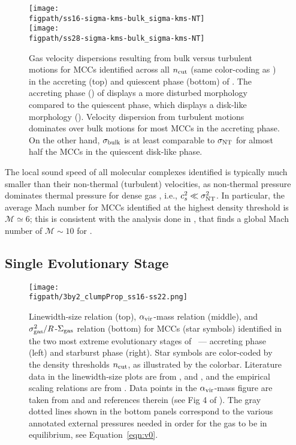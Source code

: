 \IfFileExists{emulateapjlegacy.cls}{\documentclass[iop]{emulateapjlegacy}}{\documentclass[iop]{emulateapj}}
\def\figpath{./Fig}
\begin{document}
\begin{figure}
\centering
\texttt{[image: \\figpath/ss16-sigma-kms-bulk\_sigma-kms-NT]} \\
\texttt{[image: \\figpath/ss28-sigma-kms-bulk\_sigma-kms-NT]}
\caption{Gas velocity dispersions resulting from bulk versus turbulent motions for MCCs identified across all $n_{\rm cut}$ (same color-coding as ) in the accreting (top) and quiescent phase (bottom) of \flower.
%
The accreting phase () of \flower displays a more disturbed morphology compared to the quiescent phase, which displays a disk-like morphology ().
%
Velocity dispersion from turbulent motions dominates over bulk motions for most MCCs in the accreting phase. On the other hand, $\sigma_{\rm bulk}$ is at least comparable to $\sigma_{\rm NT}$ for almost half the MCCs in the quiescent disk-like phase.
\label{fig:vv}}
\vspace{0.5em}
\end{figure}

The local sound speed of all molecular complexes identified is typically much smaller than their non-thermal (turbulent) velocities,
as non-thermal pressure dominates thermal pressure for dense gas \citep{Pallottini17b}, i.e., $c_s^2 \ll \sigma_{\rm NT}^2$. In particular, the average Mach number for MCCs identified at the highest density threshold is $\mathcal{M} \simeq6$; this is consistent with the analysis done in \citep{Vallini18a}, that finds a global Mach number of $\mathcal{M} \sim 10$ for \flower.

\subsection{Single Evolutionary Stage}  \label{sec:singless}

\begin{figure*}
\centering
\texttt{[image: \\figpath/3by2\_clumpProp\_ss16-ss22.png]}
\caption{
Linewidth-size relation (top), $\alpha_{\rm vir}$-mass relation
(middle), and $\sigma_{\rm gas}^2/R$-$\Sigma_{\rm gas}$ relation (bottom) for
MCCs (star symbols) identified in the two most extreme evolutionary
stages of \flower\ --- accreting phase (left) and starburst phase
(right). Star symbols are color-coded by the density thresholds
$n_{\rm cut}$, as illustrated by the colorbar.
Literature data in the linewidth-size plots are from \citet{Heyer04a, Rosolowsky05a, Bolatto08a,
Leroy15a}, and \citet{Swinbank11a}, and the empirical scaling relations are
from \citet{Larson81a, Heyer04a, Bolatto08a}.
Data points in the $\alpha_{\rm vir}$-mass figure are taken from
\citet{Kauffmann17a} and \citet{Kauffmann17b} and references therein
(see Fig 4 of \citealt{Kauffmann17b}).
The gray dotted lines shown in the bottom panels correspond to the various annotated external pressures needed in order for
the gas to be in equilibrium, see Equation~\ref{eqn:v0}.
\label{fig:larsons_single}}
\end{figure*}
\end{document}
